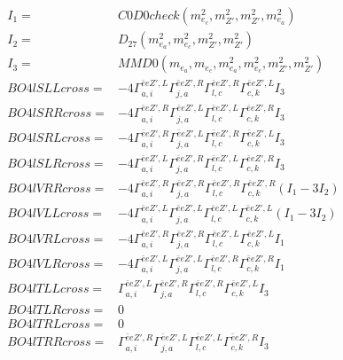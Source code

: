\documentclass[A4,landscape]{article}
\begin{document}
\begin{align} 
I_1 = & C0D0check(m^2_{e_{{c}}}, m^2_{{Z'}}, m^2_{{Z'}}, m^2_{e_{{a}}}) \\ 
I_2 = & D_{27}(m^2_{e_{{a}}}, m^2_{e_{{c}}}, m^2_{{Z'}}, m^2_{{Z'}}) \\ 
I_3 = & MMD0(m_{e_{{a}}}, m_{e_{{c}}}, m^2_{e_{{a}}}, m^2_{e_{{c}}}, m^2_{{Z'}}, m^2_{{Z'}}) \\ 
  BO4lSLLcross= & -4  \Gamma^{\bar{e}e {Z'} ,L}_{a, i} \Gamma^{\bar{e}e {Z'} ,R}_{j, a} \Gamma^{\bar{e}e {Z'} ,R}_{l, c} \Gamma^{\bar{e}e {Z'} ,L}_{c, k} I_3 \\ 
  BO4lSRRcross= & -4  \Gamma^{\bar{e}e {Z'} ,R}_{a, i} \Gamma^{\bar{e}e {Z'} ,L}_{j, a} \Gamma^{\bar{e}e {Z'} ,L}_{l, c} \Gamma^{\bar{e}e {Z'} ,R}_{c, k} I_3 \\ 
  BO4lSRLcross= & -4  \Gamma^{\bar{e}e {Z'} ,R}_{a, i} \Gamma^{\bar{e}e {Z'} ,L}_{j, a} \Gamma^{\bar{e}e {Z'} ,R}_{l, c} \Gamma^{\bar{e}e {Z'} ,L}_{c, k} I_3 \\ 
  BO4lSLRcross= & -4  \Gamma^{\bar{e}e {Z'} ,L}_{a, i} \Gamma^{\bar{e}e {Z'} ,R}_{j, a} \Gamma^{\bar{e}e {Z'} ,L}_{l, c} \Gamma^{\bar{e}e {Z'} ,R}_{c, k} I_3 \\ 
  BO4lVRRcross= & -4  \Gamma^{\bar{e}e {Z'} ,R}_{a, i} \Gamma^{\bar{e}e {Z'} ,R}_{j, a} \Gamma^{\bar{e}e {Z'} ,R}_{l, c} \Gamma^{\bar{e}e {Z'} ,R}_{c, k} (I_1 - 3 I_2) \\ 
  BO4lVLLcross= & -4  \Gamma^{\bar{e}e {Z'} ,L}_{a, i} \Gamma^{\bar{e}e {Z'} ,L}_{j, a} \Gamma^{\bar{e}e {Z'} ,L}_{l, c} \Gamma^{\bar{e}e {Z'} ,L}_{c, k} (I_1 - 3 I_2) \\ 
  BO4lVRLcross= & -4  \Gamma^{\bar{e}e {Z'} ,R}_{a, i} \Gamma^{\bar{e}e {Z'} ,R}_{j, a} \Gamma^{\bar{e}e {Z'} ,L}_{l, c} \Gamma^{\bar{e}e {Z'} ,L}_{c, k} I_1 \\ 
  BO4lVLRcross= & -4  \Gamma^{\bar{e}e {Z'} ,L}_{a, i} \Gamma^{\bar{e}e {Z'} ,L}_{j, a} \Gamma^{\bar{e}e {Z'} ,R}_{l, c} \Gamma^{\bar{e}e {Z'} ,R}_{c, k} I_1 \\ 
  BO4lTLLcross= &  \Gamma^{\bar{e}e {Z'} ,L}_{a, i} \Gamma^{\bar{e}e {Z'} ,R}_{j, a} \Gamma^{\bar{e}e {Z'} ,R}_{l, c} \Gamma^{\bar{e}e {Z'} ,L}_{c, k} I_3 \\ 
  BO4lTLRcross= & 0 \\ 
  BO4lTRLcross= & 0 \\ 
  BO4lTRRcross= &  \Gamma^{\bar{e}e {Z'} ,R}_{a, i} \Gamma^{\bar{e}e {Z'} ,L}_{j, a} \Gamma^{\bar{e}e {Z'} ,L}_{l, c} \Gamma^{\bar{e}e {Z'} ,R}_{c, k} I_3 \\ 
\end{align} 
\end{document}
